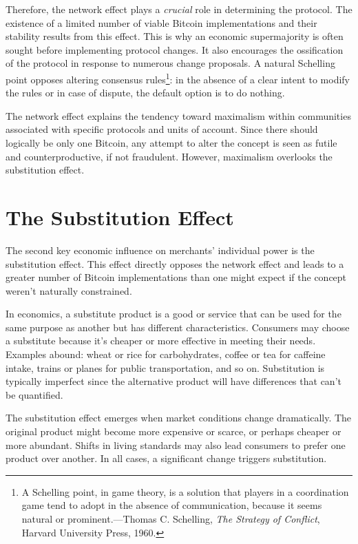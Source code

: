 \documentclass[
  a5paper,
  smalldemyvopaper,10pt,twoside,onecolumn,openright,extrafontsizes,hidelinks]{memoir}
\begin{document}
Therefore, the network effect plays a \emph{crucial} role in determining
the protocol. The existence of a limited number of viable Bitcoin
implementations and their stability results from this effect. This is
why an economic supermajority is often sought before implementing
protocol changes. It also encourages the ossification of the protocol in
response to numerous change proposals. A natural Schelling point opposes
altering consensus rules\footnote{A Schelling point, in game theory, is
  a solution that players in a coordination game tend to adopt in the
  absence of communication, because it seems natural or
  prominent.---Thomas C. Schelling, \emph{The Strategy of Conflict},
  Harvard University Press, 1960.}: in the absence of a clear intent to
modify the rules or in case of dispute, the default option is to do
nothing.

The network effect explains the tendency toward maximalism within
communities associated with specific protocols and units of account.
Since there should logically be only one Bitcoin, any attempt to alter
the concept is seen as futile and counterproductive, if not fraudulent.
However, maximalism overlooks the substitution effect.

\section*{The Substitution Effect}\label{the-substitution-effect}


The second key economic influence on merchants' individual power is the
substitution effect. This effect directly opposes the network effect and
leads to a greater number of Bitcoin implementations than one might
expect if the concept weren't naturally constrained.

In economics, a substitute product is a good or service that can be used
for the same purpose as another but has different characteristics.
Consumers may choose a substitute because it's cheaper or more effective
in meeting their needs. Examples abound: wheat or rice for
carbohydrates, coffee or tea for caffeine intake, trains or planes for
public transportation, and so on. Substitution is typically imperfect
since the alternative product will have differences that can't be
quantified.

The substitution effect emerges when market conditions change
dramatically. The original product might become more expensive or
scarce, or perhaps cheaper or more abundant. Shifts in living standards
may also lead consumers to prefer one product over another. In all
cases, a significant change triggers substitution.
\end{document}
